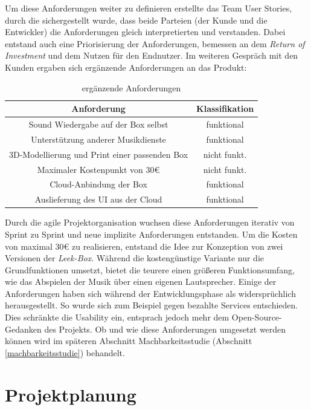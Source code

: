 \documentclass[10pt, a4paper]{article}
\begin{document}
\begin{onehalfspace}
Um diese Anforderungen weiter zu definieren erstellte das Team User Stories,
durch die sichergestellt wurde, dass beide Parteien (der Kunde und die Entwickler) die Anforderungen  gleich interpretierten und verstanden.
Dabei entstand auch eine Priorisierung der Anforderungen, bemessen an dem \textit{Return of Investment} und dem Nutzen für den Endnutzer.
Im weiteren Gespräch mit den Kunden ergaben sich ergänzende Anforderungen an das Produkt:
\begin{center}
  \begin{table}[h!]
    \begin{tabular}{c|c}
    Anforderung & Klassifikation \\
    \hline
    Sound Wiedergabe auf der Box selbst & funktional  \\
    Unterstützung anderer Musikdienste & funktional \\
    3D-Modellierung und Print einer passenden Box & nicht funkt.  \\
    Maximaler Kostenpunkt von 30€ & nicht funkt.  \\
    Cloud-Anbindung der Box & funktional \\
    Auslieferung des UI aus der Cloud & funktional \\
    \end{tabular}
    \caption{\label{erg-anforderungen}ergänzende Anforderungen}
  \end{table}
\end{center}

Durch die agile Projektorganisation wuchsen diese Anforderungen iterativ von Sprint zu Sprint und neue implizite Anforderungen entstanden.
Um die Kosten von maximal 30€ zu realisieren, entstand die Idee zur Konzeption von zwei Versionen der \textit{Leek-Box}. Während die kostengünstige Variante nur die Grundfunktionen umsetzt, bietet die teurere einen größeren Funktionsumfang, wie das Abspielen der Musik über einen eigenen Lautsprecher.
Einige der Anforderungen haben sich während der Entwicklungsphase als widersprüchlich herausgestellt.
So wurde sich zum Beispiel gegen bezahlte Services entschieden. Dies schränkte die Usability ein, entsprach jedoch mehr dem Open-Source-Gedanken des Projekts.
Ob und wie diese Anforderungen umgesetzt werden können wird im späteren Abschnitt Machbarkeitsstudie (Abschnitt \ref{machbarkeitsstudie}) behandelt.

\section{Projektplanung}

\end{onehalfspace}
\end{document}
